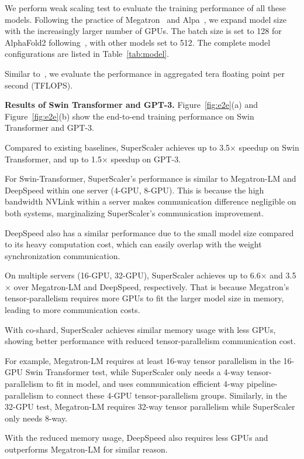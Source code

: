 We perform weak scaling test to evaluate the training performance of all these models. Following the practice of Megatron~\cite{megatron2} and Alpa~\cite{alpa}, we expand model size with the increasingly larger number of GPUs. The batch size is set to 128 for AlphaFold2 following~\cite{alphafold}, with other models set to 512. The complete model configurations are listed in Table~\ref{tab:model}. 

Similar to~\cite{megatron2,alpa}, we evaluate the performance in aggregated tera floating point per second (TFLOPS).

{\bf  Results of Swin Transformer and GPT-3. } Figure~\ref{fig:e2e}(a) and Figure~\ref{fig:e2e}(b) show the end-to-end training performance on Swin Transformer and GPT-3. 

Compared to existing baselines, {SuperScaler} achieves up to 3.5$\times$ speedup on Swin Transformer, and up to 1.5$\times$ speedup on GPT-3.

For Swin-Transformer, {SuperScaler}'s performance is similar to Megatron-LM and DeepSpeed within one server (4-GPU, 8-GPU). This is because the high bandwidth NVLink within a server makes communication difference negligible on both systems, marginalizing {SuperScaler}'s communication improvement.

DeepSpeed also has a similar performance due to the small model size compared to its heavy computation cost, which can easily overlap with the weight synchronization communication.

On multiple servers (16-GPU, 32-GPU), {SuperScaler} achieves up to 6.6$\times$ and 3.5$\times$ over Megatron-LM and DeepSpeed, respectively. That is because Megatron's tensor-parallelism requires more GPUs to fit the larger model size in memory, leading to more communication costs.

With {co-shard}, {SuperScaler} achieves similar memory usage with less GPUs, showing better performance with reduced tensor-parallelism communication cost.

For example, Megatron-LM requires at least 16-way tensor parallelism in the 16-GPU Swin Transformer test, while {SuperScaler} only needs a 4-way tensor-parallelism to fit in model, and uses communication efficient 4-way pipeline-parallelism to connect these 4-GPU tensor-parallelism groups. Similarly, in the 32-GPU test, Megatron-LM requires 32-way tensor parallelism while {SuperScaler} only needs 8-way.

With the reduced memory usage, DeepSpeed also requires less GPUs and outperforms Megatron-LM for similar reason.


